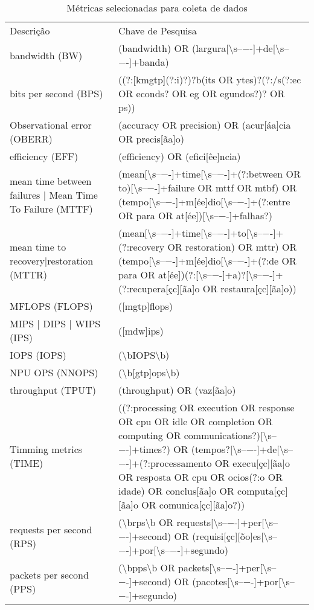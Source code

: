 \begin{table}
\caption{Métricas selecionadas para coleta de dados}
\begin{tabular}{ll}
Descrição & Chave de Pesquisa \\
bandwidth (BW) & (bandwidth) OR (largura[\textbackslash s–−-]+de[\textbackslash s–−-]+banda) \\
bits per second (BPS) & ((?:[kmgtp](?:i)?)?b(its OR ytes)?(?:/s(?:ec OR econds? OR eg OR egundos?)? OR ps)) \\
Observational error (OBERR) & (accuracy OR precision) OR (acur[áa]cia OR precis[ãa]o) \\
efficiency (EFF) & (efficiency) OR (efici[êe]ncia) \\
mean time between failures | Mean Time To Failure (MTTF) & (mean[\textbackslash s–−-]+time[\textbackslash s–−-]+(?:between OR to)[\textbackslash s–−-]+failure OR mttf OR mtbf) OR (tempo[\textbackslash s–−-]+m[ée]dio[\textbackslash s–−-]+(?:entre OR para OR at[ée])[\textbackslash s–−-]+falhas?) \\
mean time to recovery|restoration (MTTR) & (mean[\textbackslash s–−-]+time[\textbackslash s–−-]+to[\textbackslash s–−-]+(?:recovery OR restoration) OR mttr) OR (tempo[\textbackslash s–−-]+m[ée]dio[\textbackslash s–−-]+(?:de OR para OR at[ée])(?:[\textbackslash s–−-]+a)?[\textbackslash s–−-]+(?:recupera[çc][ãa]o OR restaura[çc][ãa]o)) \\
MFLOPS (FLOPS) & ([mgtp]flops) \\
MIPS | DIPS | WIPS (IPS) & ([mdw]ips) \\
IOPS (IOPS) & (\textbackslash bIOPS\textbackslash b) \\
NPU OPS (NNOPS) & (\textbackslash b[gtp]ops\textbackslash b) \\
throughput (TPUT) & (throughput) OR (vaz[ãa]o) \\
Timming metrics (TIME) & ((?:processing OR execution OR response OR cpu OR idle OR completion OR computing OR communications?)[\textbackslash s–−-]+times?) OR (tempos?[\textbackslash s–−-]+de[\textbackslash s–−-]+(?:processamento OR execu[çc][ãa]o OR resposta OR cpu OR ocios(?:o OR idade) OR conclus[ãa]o OR computa[çc][ãa]o OR comunica[çc][ãa]o?)) \\
requests per second (RPS) & (\textbackslash brps\textbackslash b OR requests[\textbackslash s–−-]+per[\textbackslash s–−-]+second) OR (requisi[çc][õo]es[\textbackslash s–−-]+por[\textbackslash s–−-]+segundo) \\
packets per second (PPS) & (\textbackslash bpps\textbackslash b OR packets[\textbackslash s–−-]+per[\textbackslash s–−-]+second) OR (pacotes[\textbackslash s–−-]+por[\textbackslash s–−-]+segundo) \\

\end{tabular}
\end{table}
